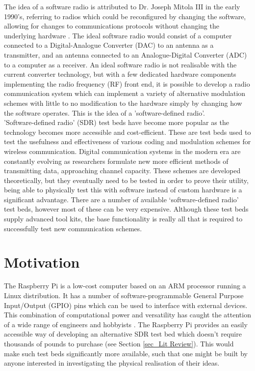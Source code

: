 \documentclass[../main.tex]{subfiles}
\begin{document}
The idea of a software radio is attributed to Dr. Joseph Mitola III in the early 1990's, referring to radios which could be reconfigured by changing the software, allowing for changes to communications protocols without changing the underlying hardware \cite{pap_Mitola}.
The ideal software radio would consist of a computer connected to a Digital-Analogue Converter (DAC) to an antenna as a transmitter, and an antenna connected to an Analogue-Digital Converter (ADC) to a computer as a receiver.
An ideal software radio is not realisable with the current converter technology, but with a few dedicated hardware components implementing the radio frequency (RF) front end, it is possible to develop a radio communication system which can implement a variety of alternative modulation schemes with little to no modification to the hardware simply by changing how the software operates.
This is the idea of a 'software-defined radio'.\\

'Software-defined radio' (SDR) test beds have become more popular as the technology becomes more accessible and cost-efficient.
These are test beds used to test the usefulness and effectiveness of various coding and modulation schemes for wireless communication.
Digital communication systems in the modern era are constantly evolving as researchers formulate new more efficient methods of transmitting data, approaching channel capacity.
These schemes are developed theoretically, but they eventually need to be tested in order to prove their utility, being able to physically test this with software instead of custom hardware is a significant advantage.
There are a number of available ‘software-defined radio’ test beds, however most of these can be very expensive.
Although these test beds supply advanced tool kits, the base functionality is really all that is required to successfully test new communication schemes.\\



\section{Motivation}

The Raspberry Pi is a low-cost computer based on an ARM processor running a Linux distribution.
It has a number of software-programmable General Purpose Input/Output (GPIO) pins which can be used to interface with external devices.
This combination of computational power and versatility has  caught the attention of a wide range of engineers and hobbyists \cite{web_AboutPi}.
The Raspberry Pi provides an easily accessible way of developing an alternative SDR test bed which doesn't require thousands of pounds to purchase (see Section \ref{sec_Lit Review}).
This would make such test beds significantly more available, such that one might be built by anyone interested in investigating the physical realisation of their ideas.\\
\end{document}
